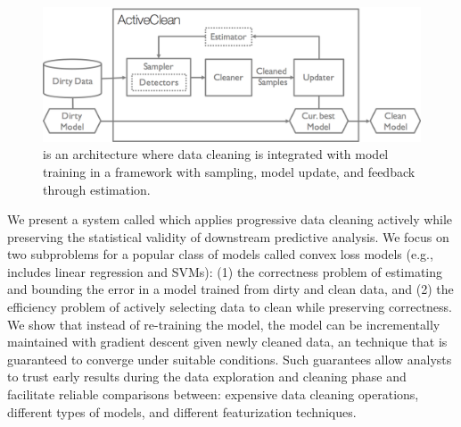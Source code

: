 \begin{figure}[t]
\centering
 \includegraphics[width=\columnwidth]{figs/arch.png}
 \caption{\sysfull is an architecture where data cleaning is integrated with model training in a framework with sampling, model update, and feedback through estimation. \label{sys-arch}}\vspace{-2em}
\end{figure}

We present a system called \sys which applies progressive data cleaning actively while preserving the statistical validity of downstream predictive analysis.
We focus on two subproblems for a popular class of models called convex loss models (e.g., includes linear regression and SVMs): (1) the correctness problem of estimating and bounding the error in a model trained from dirty and clean data, and (2) the efficiency problem of actively selecting data to clean while preserving correctness.
We show that instead of re-training the model, the model can be incrementally maintained with gradient descent given newly cleaned data, an technique that is guaranteed to converge under suitable conditions.
Such guarantees allow analysts to trust early results during the data exploration and cleaning phase and facilitate reliable comparisons between: expensive data cleaning operations, different types of models, and different featurization techniques.







